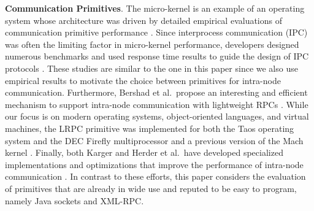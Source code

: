 \documentclass{sig-alternate}
\begin{document}
{\bf Communication Primitives}. The micro-kernel is an example of an
operating system whose architecture was driven by detailed empirical
evaluations of communication primitive performance
\cite{gefflaut-sawmill,liedtke-improve-ipc,liedtke-microkernels}.
Since interprocess communication (IPC) was often the limiting factor
in micro-kernel performance, developers designed numerous benchmarks
and used response time results to guide the design of IPC protocols
\cite{hartig-micro-kernel,liedtke-improve-ipc}.  These studies are
similar to the one in this paper since we also use empirical results
to motivate the choice between primitives for intra-node
communication.  Furthermore, Bershad et al.\ propose an interesting
and efficient mechanism to support intra-node communication with
lightweight RPCs \cite{bershad-lightweight}.  While our focus is on
modern operating systems, object-oriented languages, and virtual
machines, the LRPC primitive was implemented for both the Taos
operating system and the DEC Firefly multiprocessor
\cite{bershad-lightweight} and a previous version of the Mach kernel
\cite{bourassa-implementing}.  Finally, both Karger and Herder et
al.\ have developed specialized implementations and optimizations that
improve the performance of intra-node communication
\cite{tanenbaum-minix3,karger-registers}.  In contrast to these
efforts, this paper considers the evaluation of primitives that are
already in wide use and reputed to be easy to program, namely Java
sockets and XML-RPC.



\end{document}
